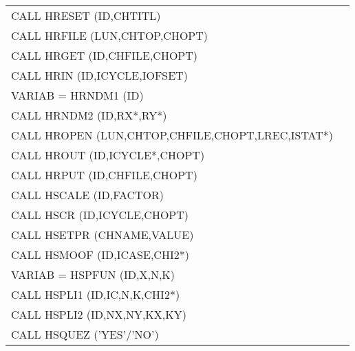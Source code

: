\begin{longtable}{|>{\ttfamily\small}p{.9\linewidth}r|}
CALL     HRESET (ID,CHTITL)                  
&                                                       \pageref{HRESET} \\
CALL     HRFILE (LUN,CHTOP,CHOPT)            
&                                                       \pageref{HRFILE} \\
CALL     HRGET  (ID,CHFILE,CHOPT)            
&                                                       \pageref{HRGET}  \\
CALL     HRIN   (ID,ICYCLE,IOFSET)           
&                                                       \pageref{HRIN}   \\
VARIAB = HRNDM1 (ID)                         
&                                                       \pageref{HRNDM1} \\
CALL     HRNDM2 (ID,RX*,RY*)                 
&                                                       \pageref{HRNDM2} \\
CALL     HROPEN (LUN,CHTOP,CHFILE,CHOPT,LREC,ISTAT*)
&                                                       \pageref{HROPEN} \\
CALL     HROUT  (ID,ICYCLE*,CHOPT)           
&                                                       \pageref{HROUT}  \\
CALL     HRPUT  (ID,CHFILE,CHOPT)            
&                                                       \pageref{HRPUT}  \\
CALL     HSCALE (ID,FACTOR)                  
&                                                       \pageref{HSCALE} \\
CALL     HSCR   (ID,ICYCLE,CHOPT)            
&                                                       \pageref{HSCR}   \\
CALL     HSETPR (CHNAME,VALUE)               
&                                                       \pageref{HSETPR} \\
CALL     HSMOOF (ID,ICASE,CHI2*)             
&                                                       \pageref{HSMOOF} \\
VARIAB = HSPFUN (ID,X,N,K)                   
&                                                       \pageref{HSPFUN} \\
CALL     HSPLI1 (ID,IC,N,K,CHI2*)            
&                                                       \pageref{HSPLI1} \\
CALL     HSPLI2 (ID,NX,NY,KX,KY)             
&                                                       \pageref{HSPLI2} \\
CALL     HSQUEZ ('YES'/'NO')                 

\end{longtable}
